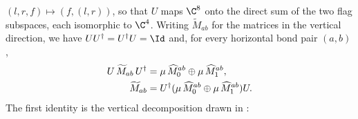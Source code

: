 \begin{lemma}
    $(l,r,f)\mapsto(f,(l,r))$, so that $U$ maps $\C^8$ onto the direct sum
    of the two flag subspaces, each isomorphic to $\C^4$.
    Writing $\widetilde M_{ab}$ for the matrices in the vertical direction,
    we have $UU^\dagger=U^\dagger U=\Id$ and, for every horizontal bond pair
    $(a,b)$,
    \begin{align}
        U\,\widetilde M_{ab}\,U^\dagger
         & =\mu\,\widehat M_0^{ab}\oplus\mu\,\widehat M_1^{ab},
        \notag                                                              \\
        \widetilde M_{ab}
         & =U^\dagger(\mu\,\widehat M_0^{ab}\oplus\mu\,\widehat M_1^{ab})U.
        \notag
    \end{align}
    The first identity is the vertical decomposition drawn in
    \cite[Proposition~4.13, lines~945--959]{Cirac2016MPDO_arXiv}:
    \begin{tenkzequation}
        \tenkzkernel
        \begin{tenkz}[rows={op,op,op}, cols=1, bonds=none]
             \\
             \\
             
        \end{tenkz}

\end{tenkzequation}
\end{lemma}
